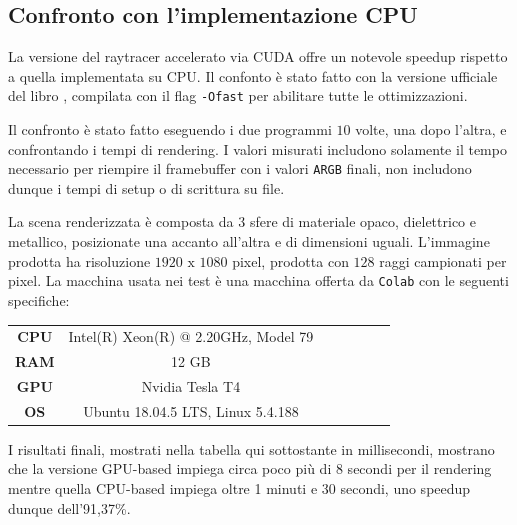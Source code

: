 \documentclass[12pt, twoside]{article}
\begin{document}
\subsection{Confronto con l'implementazione CPU}
La versione del raytracer accelerato via CUDA offre un notevole speedup
rispetto a quella implementata su CPU.
Il confonto è stato fatto con la versione ufficiale del libro
\cite{raytracingin1weekend_src}, compilata con il flag \texttt{-Ofast} per
abilitare tutte le ottimizzazioni.

Il confronto è stato fatto eseguendo i due programmi $10$ volte, una dopo
l'altra, e confrontando i tempi di rendering.
I valori misurati includono solamente il tempo necessario per riempire il
framebuffer con i valori \texttt{ARGB} finali, non includono dunque i tempi
di setup o di scrittura su file.

La scena renderizzata è composta da 3 sfere di materiale opaco, dielettrico
e metallico, posizionate una accanto all'altra e di dimensioni uguali.
L'immagine prodotta ha risoluzione $1920 \text{ x } 1080$ pixel, prodotta con
$128$ raggi campionati per pixel.
La macchina usata nei test è una macchina offerta da \texttt{Colab} con le
seguenti specifiche:

\begin{table}[h]
  \centering
  \begin{tabular}{ccccccc}
    \rowcolor[HTML]{EFEFEF} 
    \textbf{CPU} & Intel(R) Xeon(R) @ 2.20GHz, Model 79 \\
    \rowcolor[HTML]{FFFFFF} 
    \textbf{RAM} & 12 GB                                \\
    \rowcolor[HTML]{EFEFEF} 
    \textbf{GPU} & Nvidia Tesla T4                      \\
    \rowcolor[HTML]{FFFFFF} 
    \textbf{OS}  & Ubuntu 18.04.5 LTS, Linux 5.4.188   
  \end{tabular}
\end{table}

I risultati finali, mostrati nella tabella qui sottostante in millisecondi,
mostrano che la versione GPU-based impiega circa poco più di 8 secondi per il
rendering mentre quella CPU-based impiega oltre 1 minuti e 30 secondi,
uno speedup dunque dell'91,37\%.
\end{document}
